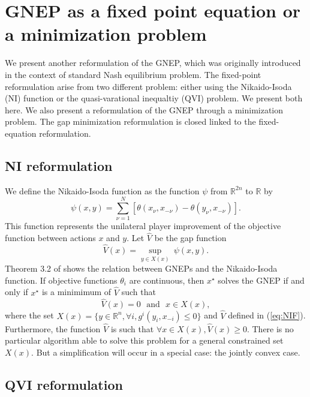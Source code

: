 \documentclass[11pt]{article}
\newcommand{\txtm}[1]{\textrm{~~#1~~}}
\newcommand{\R}{\ensuremath{\mathbb{R}}}
\begin{document}
\section{GNEP as a fixed point equation or a minimization problem}

We present another reformulation of the GNEP, which was originally introduced in the context of standard Nash equilibrium problem. 
The fixed-point reformulation arise from two different problem: either using the Nikaido-Isoda (NI) function
 or the quasi-varational inequaltiy (QVI) problem. We present both here.
We also present a reformulation of the GNEP through a minimization problem.
The gap minimization reformulation is closed linked to the fixed-equation reformulation.



\subsection{NI reformulation}

We define the Nikaido-Isoda function as the function $\psi$ from $\R^{2n}$ to  $\R$ by
\begin{equation}
\psi(x, y) = \sum_{\nu = 1}^N [ \theta(x_\nu, x_{-\nu}) -  \theta(y_\nu, x_{-\nu}) ].
\label{eq:NIF}
\end{equation}
This function represents the unilateral player  improvement of the objective function between actions $x$ and $y$. 
Let $\hat V$ be the gap function 
$$
\hat V(x) = \underset{ y \in X(x) }{\sup}~ \psi(x,y).
$$
Theorem 3.2 of \cite{facchkanz09b} shows the relation between GNEPs and the Nikaido-Isoda function. 
If objective functions $\theta_i$ are continuous, then  $x^\star$ solves the GNEP if and only if $x^\star$ 
is a minimimum of $\hat V$ such that
\begin{equation}
\hat V(x) = 0
\txtm{and} 
x \in X(x),
\label{eq:NIF:general}
\end{equation}
where the set $X(x) = \{y \in \R^n, \forall i, g^i(y_i, x_{-i}) \leq 0 \}$ and $\hat V$ defined in (\ref{eq:NIF}). Furthermore, the function $\hat V$ is such that $\forall x \in X(x), \hat V(x) \geq 0$.
There is no particular algorithm able to solve this problem for a general constrained set $X(x)$. But a simplification will occur in a special case: the jointly convex case.

\subsection{QVI reformulation}
\end{document}
